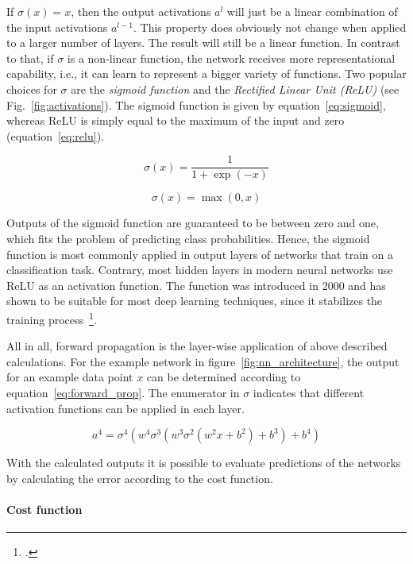 If $\sigma(x) = x$, then the output activations $a^l$ will just be a linear
combination of the input activations $a^{l-1}$.
This property does obviously not change when applied to a larger number of layers.
The result will still be a linear function.
In contrast to that, if $\sigma$ is a non-linear function, the network receives more 
representational capability, i.e., it can learn to represent a bigger variety of 
functions. 
Two popular choices for $\sigma$ are the \textit{sigmoid function} and the
\textit{Rectified Linear Unit (ReLU)} (see Fig.~\ref{fig:activations}). 
The sigmoid function is given by equation~\ref{eq:sigmoid}, whereas ReLU is 
simply equal to the maximum of the input and zero (equation~\ref{eq:relu}).

\begin{equation}
  \label{eq:sigmoid}
  \sigma(x) = \frac{1}{1 + \exp(-x)}
\end{equation}

\begin{equation}
  \label{eq:relu}
  \sigma(x) = \max(0, x)
\end{equation}

Outputs of the sigmoid function are guaranteed to be between zero and one, which fits
the problem of predicting class probabilities.
Hence, the sigmoid function is most commonly applied in output layers of networks that
train on a classification task.
Contrary, most hidden layers in modern neural networks use ReLU as an activation
function.
The function was introduced in 2000 and has shown to be suitable for most deep
learning techniques, since it stabilizes the training process~\footcite{Hahnioser2000, Nair2010}.

All in all, forward propagation is the layer-wise application of above described
calculations. For the example network in figure~\ref{fig:nn_architecture}, the
output for an example data point $x$ can be determined according to equation~\ref{eq:forward_prop}.
The enumerator in $\sigma$ indicates that different activation functions can
be applied in each layer.

\begin{equation}
  \label{eq:forward_prop}
  a^4 = \sigma^4(w^4 \sigma^3(w^3 \sigma^2(w^2 x + b^2) + b^3) + b^4)
\end{equation}

With the calculated outputs it is possible to evaluate predictions of the
networks by calculating the error according to the cost function.

\paragraph{Cost function}

